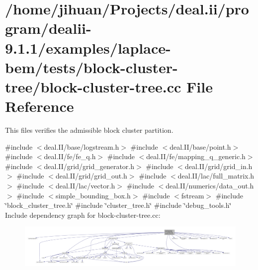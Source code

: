 \hypertarget{block-cluster-tree_8cc}{}\section{/home/jihuan/\+Projects/deal.ii/program/dealii-\/9.1.1/examples/laplace-\/bem/tests/block-\/cluster-\/tree/block-\/cluster-\/tree.cc File Reference}
\label{block-cluster-tree_8cc}


This files verifies the admissible block cluster partition.  


{\ttfamily \#include $<$deal.\+I\+I/base/logstream.\+h$>$}\newline
{\ttfamily \#include $<$deal.\+I\+I/base/point.\+h$>$}\newline
{\ttfamily \#include $<$deal.\+I\+I/fe/fe\+\_\+q.\+h$>$}\newline
{\ttfamily \#include $<$deal.\+I\+I/fe/mapping\+\_\+q\+\_\+generic.\+h$>$}\newline
{\ttfamily \#include $<$deal.\+I\+I/grid/grid\+\_\+generator.\+h$>$}\newline
{\ttfamily \#include $<$deal.\+I\+I/grid/grid\+\_\+in.\+h$>$}\newline
{\ttfamily \#include $<$deal.\+I\+I/grid/grid\+\_\+out.\+h$>$}\newline
{\ttfamily \#include $<$deal.\+I\+I/lac/full\+\_\+matrix.\+h$>$}\newline
{\ttfamily \#include $<$deal.\+I\+I/lac/vector.\+h$>$}\newline
{\ttfamily \#include $<$deal.\+I\+I/numerics/data\+\_\+out.\+h$>$}\newline
{\ttfamily \#include $<$simple\+\_\+bounding\+\_\+box.\+h$>$}\newline
{\ttfamily \#include $<$fstream$>$}\newline
{\ttfamily \#include \char`\"{}block\+\_\+cluster\+\_\+tree.\+h\char`\"{}}\newline
{\ttfamily \#include \char`\"{}cluster\+\_\+tree.\+h\char`\"{}}\newline
{\ttfamily \#include \char`\"{}debug\+\_\+tools.\+h\char`\"{}}\newline
Include dependency graph for block-\/cluster-\/tree.cc\+:\nopagebreak
\begin{figure}[H]
\begin{center}
\leavevmode
\includegraphics[width=350pt]{block-cluster-tree_8cc__incl}
\end{center}
\end{figure}
